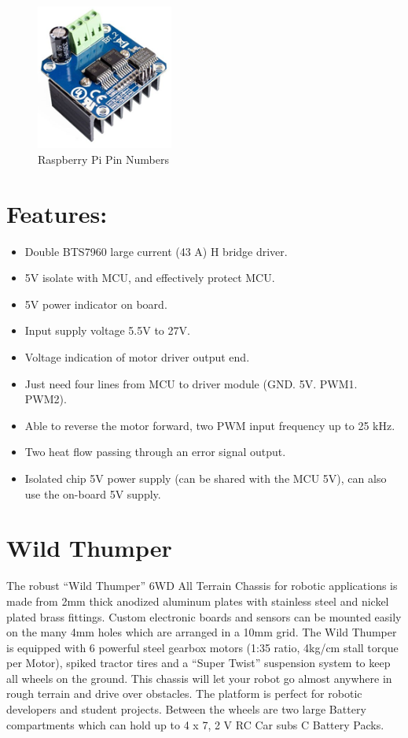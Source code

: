 \begin{figure}[ht]
    \centering
    \includegraphics[width=0.4\textwidth]{figures/BTS7960B H-bridge.png}
    \caption{Raspberry Pi Pin Numbers}
\end{figure}

\section*{ Features: }
\begin{itemize}
    \item Double BTS7960 large current (43 A) H bridge driver.
    \item 5V isolate with MCU, and effectively protect MCU.
    \item 5V power indicator on board.
    \item Input supply voltage 5.5V to 27V.
    \item Voltage indication of motor driver output end.
    \item Just need four lines from MCU to driver module (GND. 5V. PWM1. PWM2).
    \item Able to reverse the motor forward, two PWM input frequency up to 25 kHz.
    \item Two heat flow passing through an error signal output.
    \item Isolated chip 5V power supply (can be shared with the MCU 5V), can also use the on-board 5V supply.
\end{itemize}

\section*{ Wild Thumper }
The robust “Wild Thumper” 6WD All Terrain Chassis for robotic applications is made from 2mm thick anodized aluminum plates with stainless steel and nickel plated brass fittings. Custom electronic boards and sensors can be mounted easily on the many 4mm holes which are arranged in a 10mm grid. The Wild Thumper is equipped with 6 powerful steel gearbox motors (1:35 ratio, 4kg/cm stall torque per Motor), spiked tractor tires and a “Super Twist” suspension system to keep all wheels on the ground. This chassis will let your robot go almost anywhere in rough terrain and drive over obstacles. The platform is perfect for robotic developers and student projects. Between the wheels are two large Battery compartments which can hold up to 4 x 7, 2 V RC Car subs C Battery Packs.

